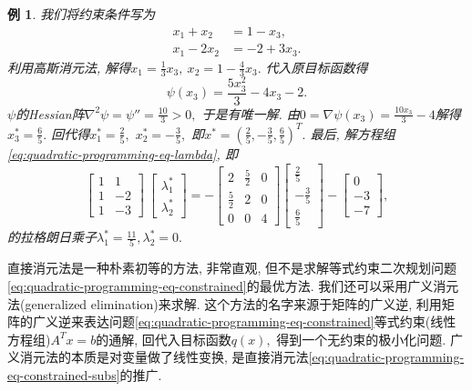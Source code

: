 \documentclass{SBCbookchapter}
\newtheorem{eg}[thm]{例}
\begin{document}
\begin{eg}
我们将约束条件写为
\begin{equation*}
\begin{aligned}
x_1 + x_2 & = 1 - x_3, \\
x_1 - 2x_2 & = -2 + 3x_3.
\end{aligned}
\end{equation*}
利用高斯消元法, 解得$x_1 = \frac{1}{3} x_3, ~ x_2 = 1 - \frac{4}{3} x_3.$ 代入原目标函数得
\begin{equation*}
\psi(x_3) = \frac{5 x_{3}^{2}}{3} - 4 x_{3} - 2.
\end{equation*}
$\psi$的Hessian阵$\nabla^2 \psi = \psi'' = \frac{10}{3} > 0,$ 于是有唯一解. 由$0 = \nabla \psi (x_3) = \frac{10 x_{3}}{3} - 4$解得$x_3^* = \frac{6}{5}.$ 回代得$x_1^* = \frac{2}{5},$ $x_2^* = -\frac{3}{5},$ 即$x^* = \left( \frac{2}{5}, -\frac{3}{5}, \frac{6}{5} \right)^T.$ 最后, 解方程组\eqref{eq:quadratic-programming-eq-lambda}, 即
\begin{equation*}
\begin{bmatrix} 1 & 1 \\ 1 & -2 \\ 1 & -3 \end{bmatrix} ~ \begin{bmatrix} \lambda_1^* \\ \lambda_2^* \end{bmatrix} = - \begin{bmatrix} 2 & \frac{5}{2} & 0 \\ \frac{5}{2} & 2 & 0 \\ 0 & 0 & 4 \end{bmatrix} \begin{bmatrix} \frac{2}{5} \\ -\frac{3}{5} \\ \frac{6}{5} \end{bmatrix} - \begin{bmatrix} 0 \\ -3 \\ -7 \end{bmatrix},
\end{equation*}
的拉格朗日乘子$\lambda_1^* = \frac{11}{5}, \lambda_2^* = 0.$
\end{eg}

直接消元法是一种朴素初等的方法, 非常直观, 但不是求解等式约束二次规划问题\eqref{eq:quadratic-programming-eq-constrained}的最优方法. 我们还可以采用广义消元法(generalized elimination)来求解. 这个方法的名字来源于矩阵的广义逆, 利用矩阵的广义逆来表达问题\eqref{eq:quadratic-programming-eq-constrained}等式约束(线性方程组)$A^T x = b$的通解, 回代入目标函数$q(x),$ 得到一个无约束的极小化问题. 广义消元法的本质是对变量做了线性变换, 是直接消元法\eqref{eq:quadratic-programming-eq-constrained-subs}的推广.
\end{document}
